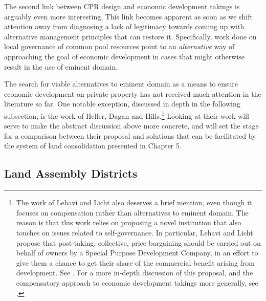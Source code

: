 
The second link between CPR design and economic development takings is arguably even more interesting. This link becomes apparent as soon as we shift attention away from diagnosing a lack of legitimacy towards coming up with alternative management principles that can restore it. Specifically, work done on local governance of common pool resources point to an {\it alternative} way of approaching the goal of economic development in cases that might otherwise result in the use of eminent domain. 

The search for viable alternatives to eminent domain as a means to ensure economic development on  private property has not received much attention in the literature so far. One notable exception, discussed in depth in the following subsection, is the work of Heller, Dagan and Hills.\footnote{The work of Lehavi and Licht also deserves a brief mention, even though it focuses on compensation rather than alternatives to eminent domain. The reason is that this work relies on proposing a novel institution that also touches on issues related to self-governance. In particular, Lehavi and Licht propose that post-taking, collective, price bargaining should be carried out on behalf of owners by a Special Purpose Development Company, in an effort to give them a chance to get their share of the commercial benefit arising from development. See \cite{lehavi07}. For a more in-depth discussion of this proposal, and the compensatory approach to economic development takings more generally, see \cite{dyrkolbotn15}.} Looking at their work will serve to make the abstract discussion above more concrete, and will set the stage for a comparison between their proposal and solutions that can be facilitated by the system of land consolidation presented in Chapter 5.

\subsection{Land Assembly Districts}\label{sec:lad}

